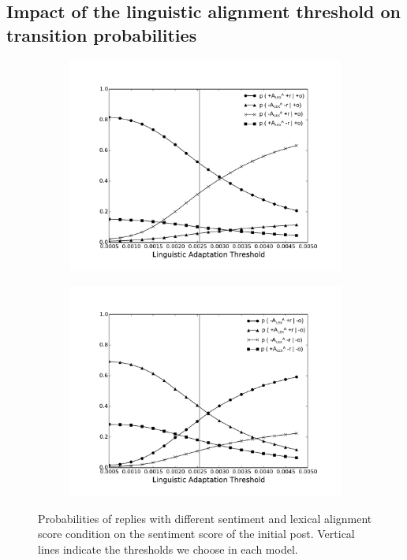 \subsection{Impact of the linguistic alignment threshold on transition probabilities}

\begin{figure}[!htb]

\begin{subfigure}{.5\textwidth}
  \centering
  \includegraphics[width=\linewidth]{Figures/LexAposi_new_rob_New_Enlarge.pdf}
  \caption{\label{fig:ProbLexPoso}}
\end{subfigure}%
\begin{subfigure}{.5\textwidth}
  \centering
  \includegraphics[width=\linewidth]{Figures/LexAnegi_new_rob_New_Enlarge.pdf}
  \caption{\label{fig:ProbLexNego}}
\end{subfigure}%
\caption{Probabilities of replies with different sentiment and lexical alignment score condition on the sentiment score of the initial post. Vertical lines indicate the thresholds we choose in each model.}
\label{fig:Probability_Change_Lex}
\up
\end{figure}

